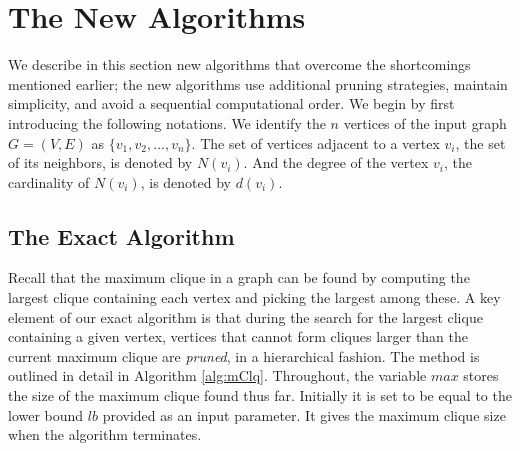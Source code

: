 \section{The New Algorithms}
\label{sec:algorithms}
We describe in this section new algorithms that overcome the shortcomings mentioned earlier; 
the new algorithms use additional pruning strategies, maintain simplicity, and 
avoid a sequential computational order.
We begin by first introducing the following notations.
We identify the $n$ vertices of the input graph $G=(V,E)$ as $\{v_1, v_2, \ldots, v_n\}$.  
The set of vertices adjacent to a vertex $v_i$, the set of its neighbors, is denoted by $N(v_i)$.
And the degree of the vertex $v_i$, the cardinality of $N(v_i)$, is 
denoted by $d(v_i)$.  

\subsection{The Exact Algorithm}
\label{subsec:exact}

Recall that the maximum clique in a graph can be found by computing the largest clique containing each vertex and picking the largest among these. 
A key element of our exact algorithm is that during the search for the largest clique containing a given vertex, vertices that cannot form cliques larger than the current maximum 
clique are {\em pruned}, in a hierarchical fashion. 
The method is outlined in detail in Algorithm \ref{alg:mClq}. 
Throughout, the variable $max$ stores the size of the maximum clique found 
thus far. Initially it is set to be equal to the lower bound $lb$ provided as an input parameter.
It gives the maximum clique size when the algorithm terminates.

